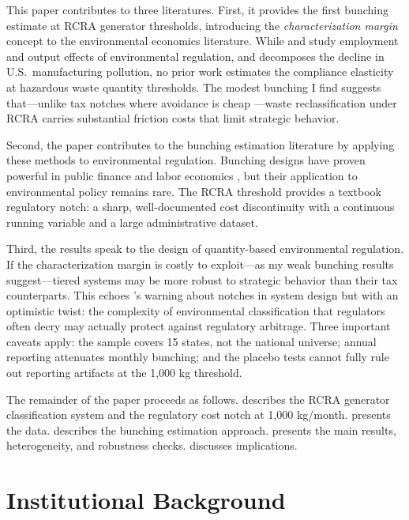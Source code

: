 \documentclass[12pt]{article}
\begin{document}
This paper contributes to three literatures. First, it provides the first bunching estimate at RCRA generator thresholds, introducing the \textit{characterization margin} concept to the environmental economics literature. While \citet{greenstone2002} and \citet{walker2013} study employment and output effects of environmental regulation, and \citet{shapiro2020} decomposes the decline in U.S.\ manufacturing pollution, no prior work estimates the compliance elasticity at hazardous waste quantity thresholds. The modest bunching I find suggests that---unlike tax notches where avoidance is cheap \citep{feldstein1999, kopczuk2005}---waste reclassification under RCRA carries substantial friction costs that limit strategic behavior.

Second, the paper contributes to the bunching estimation literature by applying these methods to environmental regulation. Bunching designs have proven powerful in public finance \citep{saez2010, kleven2013, best2023} and labor economics \citep{chetty2011}, but their application to environmental policy remains rare. The RCRA threshold provides a textbook regulatory notch: a sharp, well-documented cost discontinuity with a continuous running variable and a large administrative dataset.

Third, the results speak to the design of quantity-based environmental regulation. If the characterization margin is costly to exploit---as my weak bunching results suggest---tiered systems may be more robust to strategic behavior than their tax counterparts. This echoes \citet{slemrod2013}'s warning about notches in system design but with an optimistic twist: the complexity of environmental classification that regulators often decry may actually protect against regulatory arbitrage. Three important caveats apply: the sample covers 15 states, not the national universe; annual reporting attenuates monthly bunching; and the placebo tests cannot fully rule out reporting artifacts at the 1,000 kg threshold.

The remainder of the paper proceeds as follows.  describes the RCRA generator classification system and the regulatory cost notch at 1,000 kg/month.  presents the data.  describes the bunching estimation approach.  presents the main results, heterogeneity, and robustness checks.  discusses implications.


\section{Institutional Background}
\label{sec:background}
\end{document}
